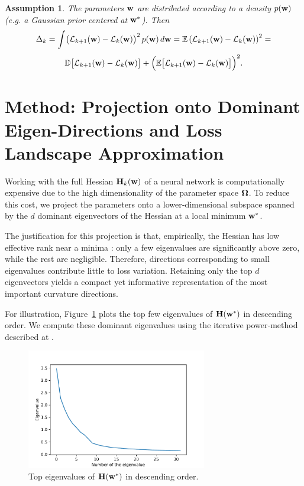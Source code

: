 \documentclass{article}
\newtheorem{assumption}{Assumption}
\begin{document}
\begin{assumption}
  The parameters $\mathbf{w}$ are distributed according to a density $p(\mathbf{w})$ (e.g. a Gaussian prior centered at $\mathbf{w}^*$).  Then
  $$
    \Delta_k =
    \int \bigl(\mathcal{L}_{k+1}(\mathbf{w})-\mathcal{L}_k(\mathbf{w})\bigr)^2\, p(\mathbf{w})\, d\mathbf{w} =
    \mathbb{E} \left( \mathcal{L}_{k+1}(\mathbf{w}) - \mathcal{L}_{k}(\mathbf{w}) \right)^2 =
  $$
  $$
    \mathbb D \bigl[ \mathcal{L}_{k+1}(\mathbf{w}) - \mathcal{L}_k(\mathbf{w}) \bigr] +
    \Bigl( \mathbb E \bigl[ \mathcal{L}_{k+1}(\mathbf{w}) - \mathcal{L}_k(\mathbf{w}) \bigr] \Bigr)^2.
  $$
\end{assumption}


\section{Method: Projection onto Dominant Eigen-Directions and Loss Landscape Approximation}

Working with the full Hessian $\mathbf{H}_k(\mathbf{w})$ of a neural network is computationally expensive due to the high dimensionality
of the parameter space $\boldsymbol{\Omega}$. To reduce this cost, we project the parameters onto a lower‑dimensional subspace spanned by the
$d$ dominant eigenvectors of the Hessian at a local minimum $\mathbf{w}^*$.

The justification for this projection is that, empirically, the Hessian has low effective rank near a minima \cite{sagun2018empirical}:
only a few eigenvalues are significantly above zero, while the rest are negligible.  Therefore, directions corresponding to small
eigenvalues contribute little to loss variation.  Retaining only the top $d$ eigenvectors yields a compact yet informative representation
of the most important curvature directions.

For illustration, Figure~\ref{fig:evgen} plots the top few eigenvalues of $\mathbf{H}(\mathbf{w}^*)$ in descending order. We compute these dominant
eigenvalues using the iterative power‐method described at \cite{hessian-eigenthings}.

\begin{figure}[!htbp]
  \centering
  \includegraphics[width=0.7\textwidth]{img/eigenvalues.pdf}
  \caption{Top eigenvalues of $\mathbf{H}(\mathbf{w}^*)$ in descending order.}
  \label{fig:evgen}
\end{figure}
\end{document}
